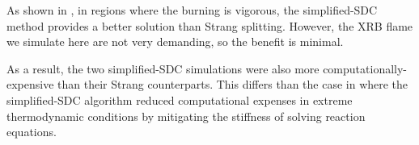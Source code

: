 \documentclass[preprint,times,tighten,linenumbers]{aastex631}
\begin{document}
\begin{comment}
\begin{figure*}
\centering
\plotone{integration_time_profile.pdf}
\caption{\label{fig:integration_profile} Time profiles showing weighted temperature and energy generation rate of the burning front for {\tt aprox13}, {\tt aprox13\_sdc}, {\tt subch\_full}, and {\tt subch\_full\_sdc}.}
\end{figure*}

\begin{figure*}
\centering
\plotone{integration_front.pdf}
\caption{\label{fig:integration_front} Flame front position as a function of time for {\tt aprox13}, {\tt aprox13\_sdc}, {\tt subch\_full}, and {\tt subch\_full\_sdc}. The dashed lines are the fitted curves using Eq. \ref{Eq:quadratic_fit} and Eq.\ref{Eq:tanh_fit}.}
\end{figure*}
\end{comment}

As shown in \citet{castro_simple_sdc}, in regions where the burning
is vigorous, the simplified-SDC method provides a better solution
than Strang splitting.  However, the XRB flame we simulate here
are not very demanding, so the benefit is minimal.  
\begin{comment}
is not extreme enough for nuclear statistical equilibrium to occur, any difference between simplified-SDC and Strang-splitting schemes is expected to be negligible. This is supported by the temperature and $\dot{e}_{\textrm{nuc}}$ profiles for {\tt aprox13\_sdc} and {\tt subch\_full\_sdc} shown in Figure \ref{fig:integration_profile}, which are almost identical, except for minor variations in $\dot{e}_{\textrm{nuc}}$ for {\tt subch\_full} and {\tt subch\_full\_sdc}. Similarly, the flame front position plots shown in Figure \ref{fig:integration_front} for the simplified-SDC simulations are nearly identical compared to their counterparts, with minor variations (Table \ref{Tab:network_instan_vel}) in the instantaneous flame speed calculated using the the fitting function. 
\end{comment}
As a result, the two simplified-SDC simulations were also more
computationally-expensive than their Strang counterparts.
This differs than the case in \citet{castro_simple_sdc} where 
the simplified-SDC algorithm reduced computational expenses in extreme thermodynamic conditions by mitigating the stiffness of solving reaction equations.


\end{document}
